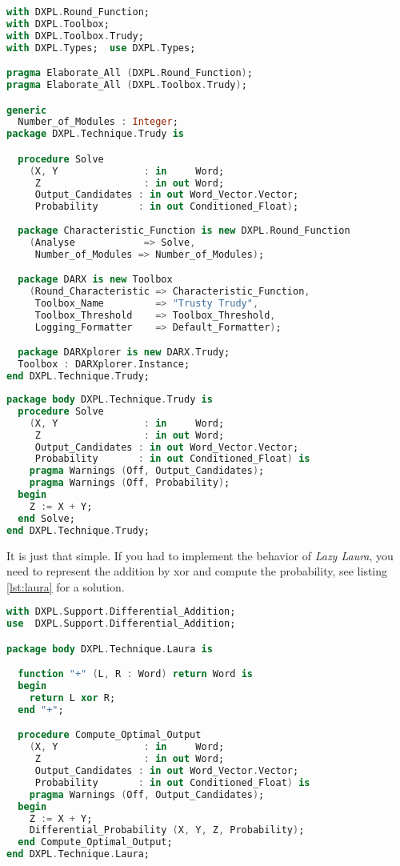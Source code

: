 \documentclass{acmtrans2m}
\begin{document}
\begin{lstlisting}[label=lst:trudy,language=ada,caption=dxpl-technique-trudy.ads]
with DXPL.Round_Function;
with DXPL.Toolbox;
with DXPL.Toolbox.Trudy;
with DXPL.Types;  use DXPL.Types;

pragma Elaborate_All (DXPL.Round_Function);
pragma Elaborate_All (DXPL.Toolbox.Trudy);

generic
  Number_of_Modules : Integer;
package DXPL.Technique.Trudy is

  procedure Solve
    (X, Y				: in     Word;
     Z					: in out Word;
     Output_Candidates : in out Word_Vector.Vector;
     Probability       : in out Conditioned_Float);
  
  package Characteristic_Function is new DXPL.Round_Function
    (Analyse 			=> Solve,
     Number_of_Modules => Number_of_Modules);

  package DARX is new Toolbox
    (Round_Characteristic => Characteristic_Function,
     Toolbox_Name		  => "Trusty Trudy",
     Toolbox_Threshold    => Toolbox_Threshold,
     Logging_Formatter    => Default_Formatter);

  package DARXplorer is new DARX.Trudy;
  Toolbox : DARXplorer.Instance;
end DXPL.Technique.Trudy;
\end{lstlisting}

\vfill

\begin{lstlisting}[label=lst:trudy2,language=ada,caption=dxpl-technique-trudy.adb]
package body DXPL.Technique.Trudy is
  procedure Solve
    (X, Y				: in     Word;
     Z					: in out Word;
     Output_Candidates : in out Word_Vector.Vector;
     Probability       : in out Conditioned_Float) is
    pragma Warnings (Off, Output_Candidates);
    pragma Warnings (Off, Probability);
  begin
    Z := X + Y;
  end Solve;
end DXPL.Technique.Trudy;
\end{lstlisting}

\clearpage

It is just that simple. If you had to implement the behavior of
\textit{Lazy Laura}, you need to represent the addition by
xor and compute the probability, see listing \ref{lst:laura} for
a solution.

\begin{lstlisting}[label=lst:laura,language=ada,caption=dxpl-technique-laura.adb]
with DXPL.Support.Differential_Addition;
use  DXPL.Support.Differential_Addition;

package body DXPL.Technique.Laura is

  function "+" (L, R : Word) return Word is
  begin
    return L xor R;
  end "+";

  procedure Compute_Optimal_Output
    (X, Y				: in     Word;
     Z					: in out Word;
     Output_Candidates : in out Word_Vector.Vector;
     Probability       : in out Conditioned_Float) is
    pragma Warnings (Off, Output_Candidates);
  begin
    Z := X + Y;
    Differential_Probability (X, Y, Z, Probability);
  end Compute_Optimal_Output;
end DXPL.Technique.Laura;
\end{lstlisting}
\end{document}
